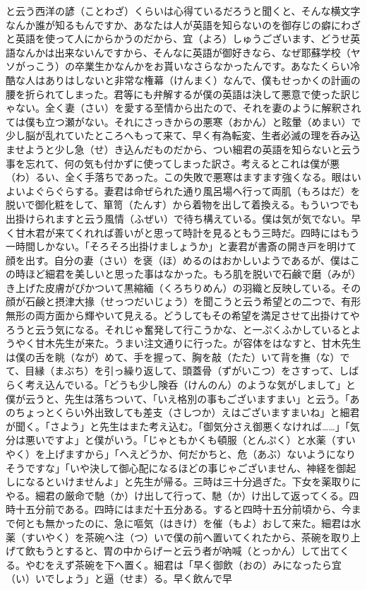 \documentclass{book}
\begin{document}
と云う西洋の諺（ことわざ）くらいは心得ているだろうと聞くと、そんな横文字なんか誰が知るもんですか、あなたは人が英語を知らないのを御存じの癖にわざと英語を使って人にからかうのだから、宜（よろ）しゅうございます、どうせ英語なんかは出来ないんですから、そんなに英語が御好きなら、なぜ耶蘇学校（ヤソがっこう）の卒業生かなんかをお貰いなさらなかったんです。あなたくらい冷酷な人はありはしないと非常な権幕（けんまく）なんで、僕もせっかくの計画の腰を折られてしまった。君等にも弁解するが僕の英語は決して悪意で使った訳じゃない。全く妻（さい）を愛する至情から出たので、それを妻のように解釈されては僕も立つ瀬がない。それにさっきからの悪寒（おかん）と眩暈（めまい）で少し脳が乱れていたところへもって来て、早く有為転変、生者必滅の理を呑み込ませようと少し急（せ）き込んだものだから、つい細君の英語を知らないと云う事を忘れて、何の気も付かずに使ってしまった訳さ。考えるとこれは僕が悪（わ）るい、全く手落ちであった。この失敗で悪寒はますます強くなる。眼はいよいよぐらぐらする。妻君は命ぜられた通り風呂場へ行って両肌（もろはだ）を脱いで御化粧をして、箪笥（たんす）から着物を出して着換える。もういつでも出掛けられますと云う風情（ふぜい）で待ち構えている。僕は気が気でない。早く甘木君が来てくれれば善いがと思って時計を見るともう三時だ。四時にはもう一時間しかない。「そろそろ出掛けましょうか」と妻君が書斎の開き戸を明けて顔を出す。自分の妻（さい）を褒（ほ）めるのはおかしいようであるが、僕はこの時ほど細君を美しいと思った事はなかった。もろ肌を脱いで石鹸で磨（みが）き上げた皮膚がぴかついて黒縮緬（くろちりめん）の羽織と反映している。その顔が石鹸と摂津大掾（せっつだいじょう）を聞こうと云う希望との二つで、有形無形の両方面から輝やいて見える。どうしてもその希望を満足させて出掛けてやろうと云う気になる。それじゃ奮発して行こうかな、と一ぷくふかしているとようやく甘木先生が来た。うまい注文通りに行った。が容体をはなすと、甘木先生は僕の舌を眺（なが）めて、手を握って、胸を敲（たた）いて背を撫（な）でて、目縁（まぶち）を引っ繰り返して、頭蓋骨（ずがいこつ）をさすって、しばらく考え込んでいる。「どうも少し険呑（けんのん）のような気がしまして」と僕が云うと、先生は落ちついて、「いえ格別の事もございますまい」と云う。「あのちょっとくらい外出致しても差支（さしつか）えはございますまいね」と細君が聞く。「さよう」と先生はまた考え込む。「御気分さえ御悪くなければ\ldots{}\ldots{}」「気分は悪いですよ」と僕がいう。「じゃともかくも頓服（とんぷく）と水薬（すいやく）を上げますから」「へえどうか、何だかちと、危（あぶ）ないようになりそうですな」「いや決して御心配になるほどの事じゃございません、神経を御起しになるといけませんよ」と先生が帰る。三時は三十分過ぎた。下女を薬取りにやる。細君の厳命で馳（か）け出して行って、馳（か）け出して返ってくる。四時十五分前である。四時にはまだ十五分ある。すると四時十五分前頃から、今まで何とも無かったのに、急に嘔気（はきけ）を催（もよ）おして来た。細君は水薬（すいやく）を茶碗へ注（つ）いで僕の前へ置いてくれたから、茶碗を取り上げて飲もうとすると、胃の中からげーと云う者が吶喊（とっかん）して出てくる。やむをえず茶碗を下へ置く。細君は「早く御飲（おの）みになったら宜（い）いでしょう」と逼（せま）る。早く飲んで早
\end{document}
